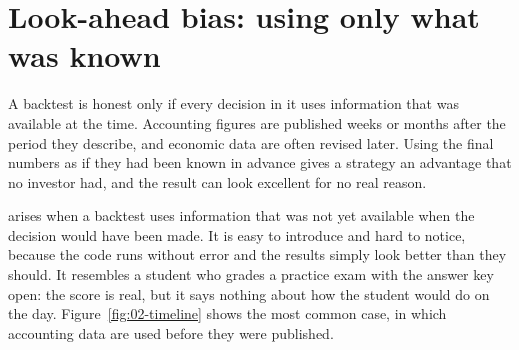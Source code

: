 \section{Look-ahead bias: using only what was known}
\label{sec:02-lookahead}

A backtest is honest only if every decision in it uses information that was available at the time. Accounting figures are published weeks or months after the period they describe, and economic data are often revised later. Using the final numbers as if they had been known in advance gives a strategy an advantage that no investor had, and the result can look excellent for no real reason.

 arises when a backtest uses information that was not yet available when the decision would have been made. It is easy to introduce and hard to notice, because the code runs without error and the results simply look better than they should. It resembles a student who grades a practice exam with the answer key open: the score is real, but it says nothing about how the student would do on the day. Figure~\ref{fig:02-timeline} shows the most common case, in which accounting data are used before they were published.



